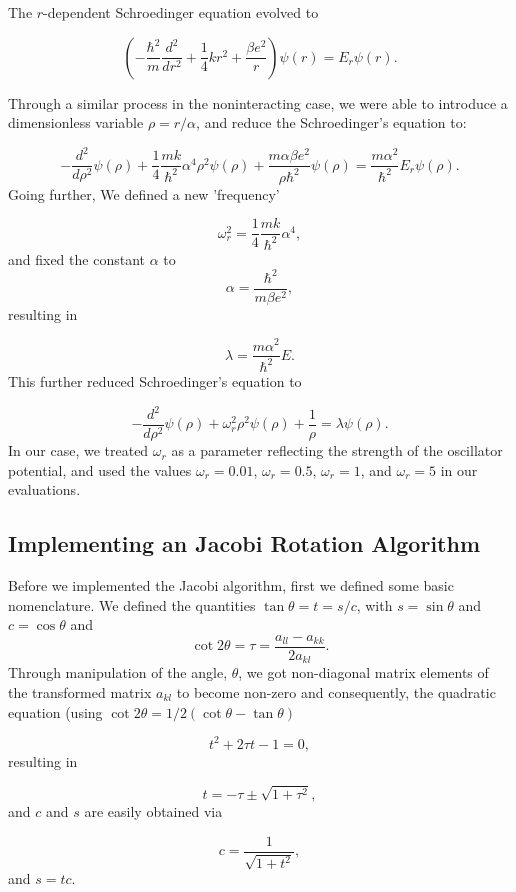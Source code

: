 \documentclass[10pt,showpacs,preprintnumbers,footinbib,amsmath,amssymb,aps,prl,twocolumn,groupedaddress,superscriptaddress,showkeys]{revtex4-1}
\begin{document}
The $r$-dependent Schroedinger equation evolved to

\begin{equation*}
\left(  -\frac{\hbar^2}{m} \frac{d^2}{dr^2}+ \frac{1}{4}k r^2+\frac{\beta e^2}{r}\right)\psi(r)  = E_r \psi(r).
\end{equation*}

Through a similar process in the noninteracting case, we were able to introduce a dimensionless variable $\rho = r/\alpha$, and reduce the Schroedinger's equation to:

\begin{equation*}
-\frac{d^2}{d\rho^2} \psi(\rho) 
+ \frac{1}{4}\frac{mk}{\hbar^2} \alpha^4\rho^2\psi(\rho)+\frac{m\alpha \beta e^2}{\rho\hbar^2}\psi(\rho)  = 
\frac{m\alpha^2}{\hbar^2}E_r \psi(\rho) .
\end{equation*}
Going further, We defined a new 'frequency'

\begin{equation*}
\omega_r^2=\frac{1}{4}\frac{mk}{\hbar^2} \alpha^4,
\end{equation*}
and fixed the constant $\alpha$ to
\begin{equation*}
\alpha = \frac{\hbar^2}{m\beta e^2},
\end{equation*}
resulting in

\begin{equation*}
\lambda = \frac{m\alpha^2}{\hbar^2}E.
\end{equation*}
This further reduced Schroedinger's equation to

\begin{equation*}
-\frac{d^2}{d\rho^2} \psi(\rho) + \omega_r^2\rho^2\psi(\rho) +\frac{1}{\rho} = \lambda \psi(\rho).
\end{equation*}
In our case, we treated $\omega_r$ as a parameter reflecting the strength of the oscillator potential, and used the values
$\omega_r = 0.01$, $\omega_r = 0.5$, $\omega_r =1$, and $\omega_r = 5$ in our evaluations.

        \subsection{Implementing an Jacobi Rotation Algorithm}
Before we implemented the Jacobi algorithm, first we defined some basic nomenclature. We defined the quantities $\tan\theta = t= s/c$, with $s=\sin\theta$ and $c=\cos\theta$ and 
\begin{equation*}\cot 2\theta=\tau = \frac{a_{ll}-a_{kk}}{2a_{kl}}.
\end{equation*}
Through manipulation of the angle, $\theta$, we got non-diagonal matrix elements of the transformed matrix 
$a_{kl}$ to become non-zero and
consequently, the quadratic equation (using $\cot 2\theta=1/2(\cot \theta-\tan\theta)$

\begin{equation*}
t^2+2\tau t-1= 0,
\end{equation*}
resulting in

\begin{equation*}
t = -\tau \pm \sqrt{1+\tau^2},
\end{equation*}
and $c$ and $s$ are easily obtained via

\begin{equation*}
c = \frac{1}{\sqrt{1+t^2}},
\end{equation*}
and $s=tc$.  
\end{document}
